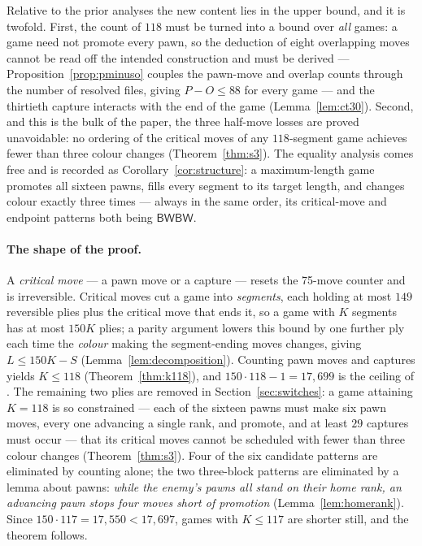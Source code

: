 \documentclass[11pt]{article}
\theoremstyle{definition}
\theoremstyle{remark}
\theoremstyle{plain}
\begin{document}
Relative to the prior analyses the new content lies in the upper bound,
and it is twofold. First, the count of $118$ must be turned into a bound
over \emph{all} games: a game need not promote every pawn, so the
deduction of eight overlapping moves cannot be read off the intended
construction and must be derived --- Proposition~\ref{prop:pminuso}
couples the pawn-move and overlap counts through the number of resolved
files, giving $P - O \le 88$ for every game --- and the thirtieth
capture interacts with the end of the game (Lemma~\ref{lem:ct30}).
Second, and this is the bulk of the paper, the three half-move losses
are proved unavoidable: no ordering of the critical moves of any
$118$-segment game achieves fewer than three colour changes
(Theorem~\ref{thm:s3}). The equality analysis comes free and is recorded
as Corollary~\ref{cor:structure}: a maximum-length game promotes all
sixteen
pawns, fills every segment to its target length, and changes colour
exactly three times --- always in the same order, its critical-move and
endpoint patterns both being $\mathsf{BWBW}$.

\paragraph{The shape of the proof.}
A \emph{critical move} --- a pawn move or a capture --- resets the 75-move
counter and is irreversible. Critical moves cut a game into \emph{segments},
each holding at most $149$ reversible plies plus the critical move that ends
it, so a game with $K$ segments has at most $150K$ plies; a parity argument
lowers this bound by one further ply each time the \emph{colour} making the
segment-ending moves changes, giving $L \le 150K - S$
(Lemma~\ref{lem:decomposition}). Counting pawn moves and captures yields
$K \le 118$ (Theorem~\ref{thm:k118}), and $150 \cdot 118 - 1 = 17{,}699$ is
the ceiling of \cite{murphy2020longest}. The remaining two plies are
removed in Section~\ref{sec:switches}: a game attaining $K = 118$ is so
constrained --- each of the sixteen pawns must make six pawn moves,
every one advancing a single rank, and promote, and at least $29$
captures must occur --- that its critical
moves cannot be scheduled with fewer than three colour changes
(Theorem~\ref{thm:s3}). Four of the six candidate patterns are
eliminated by counting alone; the two three-block patterns are
eliminated by a lemma about
pawns: \emph{while the enemy's pawns all stand on their home rank, an
advancing pawn stops four moves short of promotion}
(Lemma~\ref{lem:homerank}). Since $150 \cdot 117 = 17{,}550 < 17{,}697$,
games with $K \le 117$ are shorter still, and the theorem follows.
\end{document}

